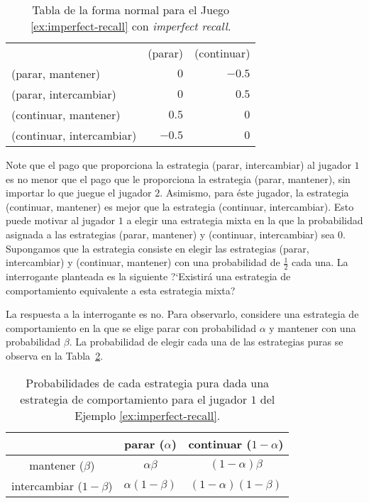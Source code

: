 \begin{table}[h]
\begin{center}
\caption[Tabla de la forma normal para un juego con \textit{imperfect recall}]{Tabla de la forma normal para el Juego \ref{ex:imperfect-recall} con \textit{imperfect recall}.}
\label{table:imperfect-recall}
\begin{tabular}{l | r | r |}
\multicolumn{1}{c}{} & \multicolumn{1}{c}{(parar)} & \multicolumn{1}{c}{(continuar)} \\ \cline{2-3}
(parar,     mantener)     & $0$ & $-0.5$ \\ \cline{2-3}
(parar,     intercambiar) & $0$ & $0.5$ \\ \cline{2-3}
(continuar, mantener)     & $0.5$ & $0$ \\ \cline{2-3}
(continuar, intercambiar) & $-0.5$ & $0$ \\ \cline{2-3}
\end{tabular}
\end{center}
\end{table}

Note que el pago que proporciona la estrategia (parar, intercambiar) al jugador $1$ es no menor que el pago que le proporciona la estrategia (parar, mantener), sin importar lo que juegue el jugador $2$. Asimismo, para éste jugador, la estrategia (continuar, mantener) es mejor que la estrategia (continuar, intercambiar). Esto puede motivar al jugador $1$ a elegir una estrategia mixta en la que la probabilidad asignada a las estrategias (parar, mantener) y (continuar, intercambiar) sea $0$. Supongamos que la estrategia consiste en elegir las estrategias (parar, intercambiar) y (continuar, mantener) con una probabilidad de $\frac{1}{2}$ cada una. La interrogante planteada es la siguiente ?`Existirá una estrategia de comportamiento equivalente a esta estrategia mixta?

La respuesta a la interrogante es no. Para observarlo, considere una estrategia de comportamiento en la que se elige parar con probabilidad $\alpha$ y mantener con una probabilidad $\beta$. La probabilidad de elegir cada una de las estrategias puras se observa en la Tabla~\ref{table:proba-ep}.

\begin{table}[h]
\begin{center}
\caption[Probabilidades de las Estrategias Puras]{Probabilidades de cada estrategia pura dada una estrategia de comportamiento para el jugador $1$ del Ejemplo \ref{ex:imperfect-recall}.}
\label{table:proba-ep}
\begin{tabular}{c c c}
\hline
& parar ($\alpha$) & continuar ($1 - \alpha$) \\ \hline
mantener ($\beta$)       & $\alpha\beta$     & $(1-\alpha)\beta$    \\
intercambiar ($1-\beta$) & $\alpha(1-\beta)$ & $(1-\alpha)(1-\beta)$\\ \hline
\end{tabular}
\end{center}
\end{table}

